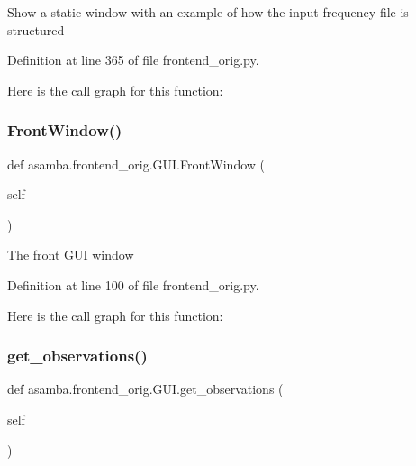 \begin{DoxyVerb}Show a static window with an example of how the input frequency file is structured \end{DoxyVerb}
 

Definition at line 365 of file frontend\+\_\+orig.\+py.

Here is the call graph for this function\+:
\mbox{\label{classasamba_1_1frontend__orig_1_1_g_u_i_a0fd564268af273f977bc8065e26e110b}} 
\subsubsection{\texorpdfstring{Front\+Window()}{FrontWindow()}}
{\footnotesize\ttfamily def asamba.\+frontend\+\_\+orig.\+G\+U\+I.\+Front\+Window (\begin{DoxyParamCaption}\item[{}]{self }\end{DoxyParamCaption})}

\begin{DoxyVerb}The front GUI window \end{DoxyVerb}
 

Definition at line 100 of file frontend\+\_\+orig.\+py.

Here is the call graph for this function\+:
\mbox{\label{classasamba_1_1frontend__orig_1_1_g_u_i_a2115a025361cf5282c72baef51ec0004}} 
\subsubsection{\texorpdfstring{get\+\_\+observations()}{get\_observations()}}
{\footnotesize\ttfamily def asamba.\+frontend\+\_\+orig.\+G\+U\+I.\+get\+\_\+observations (\begin{DoxyParamCaption}\item[{}]{self }\end{DoxyParamCaption})}

